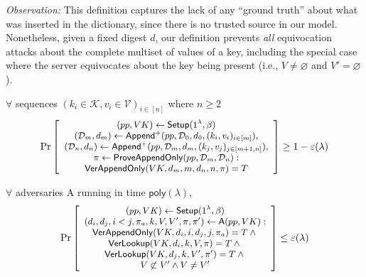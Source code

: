 \noindent \textit{Observation:}
This definition captures the lack of any ``ground truth'' about what was inserted in the dictionary, since there is no trusted source in our model.
Nonetheless, given a fixed digest $d$, our definition prevents \textit{all} equivocation attacks about the complete multiset of values of a key, including the special case where the server equivocates about the key being present (i.e., $V \ne \varnothing$ and $V' = \varnothing$).

\label{s:aad:appendonly-correctness}
$\forall$ sequences $(k_i\in \mathcal{K}, v_i\in\mathcal{V})_{i\in [n]}$ where $n\ge 2$
\begin{align*}
\small
\Pr \left[ \begin{array}{c}
    (pp,VK) \leftarrow \mathsf{Setup}(1^\lambda, \beta) \\
    (\mathcal{D}_m, d_m) \leftarrow \mathsf{Append}^{+}(pp,\mathcal{D}_0,d_0,(k_i, v_i)_{i\in [m]}),\\
    (\mathcal{D}_n, d_n) \leftarrow \mathsf{Append}^{+}(pp,\mathcal{D}_m,d_m,(k_j, v_j)_{j\in [m+1,n]}),  \\
    \pi \leftarrow \mathsf{ProveAppendOnly}(pp,\mathcal{D}_m, \mathcal{D}_n):\\
    {\mathsf{VerAppendOnly}(VK, d_m, m, d_n, n, \pi) = T}
\end{array} \right] \ge 1 - \varepsilon(\lambda)
\end{align*}

\label{s:aad:appendonly-security}
$\forall$ adversaries \textsf{A} running in time $\mathsf{poly}(\lambda)$,
\begin{align*}
\small
\Pr \left[ \begin{array}{c}
    (pp,VK) \leftarrow \mathsf{Setup}(1^\lambda, \beta)\\
    (d_i,d_j,i<j,\pi_a, k,V, V',\pi,\pi') \leftarrow \mathsf{A}(pp, VK)
    : \\
    {\mathsf{VerAppendOnly}(VK, d_i, i, d_j, j, \pi_a) = T} \wedge {}\\
    {\mathsf{VerLookup}(VK, d_i, k, V , \pi )  = T} \wedge {}\\
    {\mathsf{VerLookup}(VK, d_j, k, V', \pi') = T} \wedge {}\\
    {V\not\subset V' \wedge V\ne V'}
\end{array} \right] \le \varepsilon(\lambda)
\end{align*}

